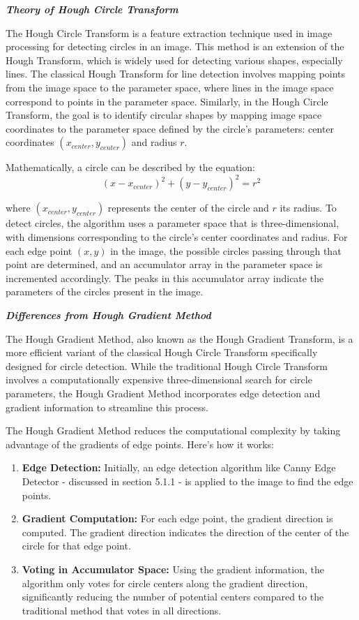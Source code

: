 \textbf{\textit{Theory of Hough Circle Transform}}

The Hough Circle Transform is a feature extraction technique used in image processing for detecting circles in an image. This method is an extension of the Hough Transform, which is widely used for detecting various shapes, especially lines. The classical Hough Transform for line detection involves mapping points from the image space to the parameter space, where lines in the image space correspond to points in the parameter space. Similarly, in the Hough Circle Transform, the goal is to identify circular shapes by mapping image space coordinates to the parameter space defined by the circle's parameters: center coordinates \((x_{center}, y_{center})\) and radius \(r\).

Mathematically, a circle can be described by the equation:
\begin{equation}
(x - x_{center})^2 + (y - y_{center})^2 = r^2
\end{equation}

where \((x_{center}, y_{center})\) represents the center of the circle and \(r\) its radius. To detect circles, the algorithm uses a parameter space that is three-dimensional, with dimensions corresponding to the circle's center coordinates and radius. For each edge point \((x, y)\) in the image, the possible circles passing through that point are determined, and an accumulator array in the parameter space is incremented accordingly. The peaks in this accumulator array indicate the parameters of the circles present in the image.

\textbf{\textit{Differences from Hough Gradient Method}}

The Hough Gradient Method, also known as the Hough Gradient Transform, is a more efficient variant of the classical Hough Circle Transform specifically designed for circle detection. While the traditional Hough Circle Transform involves a computationally expensive three-dimensional search for circle parameters, the Hough Gradient Method incorporates edge detection and gradient information to streamline this process.

The Hough Gradient Method reduces the computational complexity by taking advantage of the gradients of edge points. Here’s how it works:
\begin{enumerate}
        \item \textbf{Edge Detection:} Initially, an edge detection algorithm like Canny Edge Detector - discussed in section 5.1.1 - is applied to the image to find the edge points.
        \item \textbf{Gradient Computation:} For each edge point, the gradient direction is computed. The gradient direction indicates the direction of the center of the circle for that edge point.
        \item \textbf{Voting in Accumulator Space:} Using the gradient information, the algorithm only votes for circle centers along the gradient direction, significantly reducing the number of potential centers compared to the traditional method that votes in all directions.
\end{enumerate}


